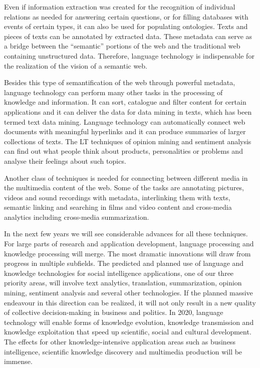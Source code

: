 \documentclass[10pt, plain]{../../metanetpaper}
\begin{document}
\begin{multicols}{2}
Even if information extraction was created for the recognition of individual relations as needed for answering certain questions, or for filling databases with events of certain types, it can also be used for populating ontologies. Texts and pieces of texts can be annotated by extracted data. These metadata can serve as a bridge between the “semantic” portions of the web and the traditional web containing unstructured data. Therefore, language technology is indispensable for the realization of the vision of a semantic web. 
 
Besides this type of semantification of the web through powerful metadata, language technology can perform many other tasks in the processing of knowledge and information. It can sort, catalogue and filter content for certain applications and it can deliver the data for data mining in texts, which has been termed text data mining. Language technology can automatically connect web documents with meaningful hyperlinks and it can produce summaries of larger collections of texts. The LT techniques of opinion mining and sentiment analysis can find out what people think about products, personalities or problems and analyse their feelings about such topics.
 
Another class of techniques is needed for connecting between different media in the multimedia content of the web. Some of the tasks are annotating pictures, videos and sound recordings with metadata, interlinking them with texts, semantic linking and searching in films and video content and cross-media analytics including cross-media summarization.
 
In the next few years we will see considerable advances for all these techniques. For large parts of research and application development, language processing and knowledge processing will merge. The most dramatic innovations will draw from progress in multiple subfields. The predicted and planned use of language and knowledge technologies for social intelligence applications, one of our three priority areas, will involve text analytics, translation, summarization, opinion mining, sentiment analysis and several other technologies. If the planned massive endeavour in this direction can be realized, it will not only result in a new quality of collective decision-making in business and politics. In 2020, language technology will enable forms of knowledge evolution, knowledge transmission and knowledge exploitation that speed up scientific, social and cultural development. The effects for other knowledge-intensive application areas such as business intelligence, scientific knowledge discovery and multimedia production will be immense.


\end{multicols}
\end{document}
